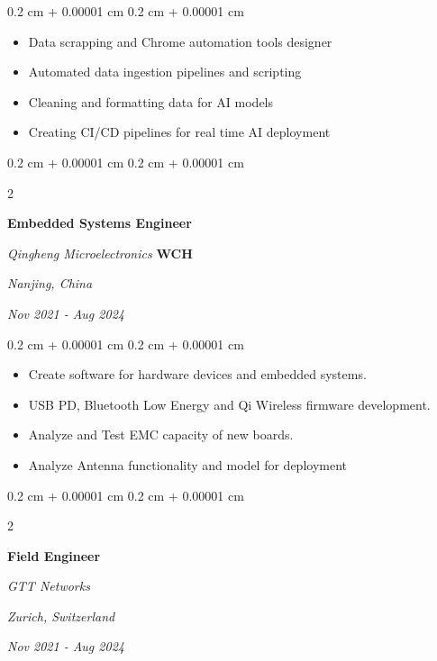 \documentclass[10pt, letterpaper]{article}
\newenvironment{highlights}{
    \begin{itemize}[
        topsep=0.10 cm,
        parsep=0.10 cm,
        partopsep=0pt,
        itemsep=0pt,
        leftmargin=0.4 cm + 10pt
    ]
}{
    \end{itemize}
} %
\newenvironment{onecolentry}{
    \begin{adjustwidth}{
        0.2 cm + 0.00001 cm
    }{
        0.2 cm + 0.00001 cm
    }
}{
    \end{adjustwidth}
} %
\newenvironment{twocolentry}[2][]{
    \onecolentry
    \def\secondColumn{#2}
    \setcolumnwidth{\fill, 4.5 cm}
    \begin{paracol}{2}
}{
    \switchcolumn \raggedleft \secondColumn
    \end{paracol}
    \endonecolentry
} %
\begin{document}
        \vspace{0.10 cm}
        \begin{onecolentry}
            \begin{highlights}
                \item Data scrapping and Chrome automation tools designer
                \item Automated data ingestion pipelines and scripting
                \item Cleaning and formatting data for AI models
                \item Creating CI/CD pipelines for real time AI deployment
            \end{highlights}
        \end{onecolentry}


        \vspace{0.5 cm}

        \begin{twocolentry}{
        \textit{Nanjing, China}    
            
        \textit{Nov 2021 - Aug 2024}}
            \textbf{Embedded Systems Engineer}
            
            \textit{Qingheng Microelectronics } \textbf{WCH}
        \end{twocolentry}

        \vspace{0.10 cm}
        \begin{onecolentry}
            \begin{highlights}
                \item Create software for hardware devices and embedded systems.
                \item USB PD, Bluetooth Low Energy and Qi Wireless firmware development.
                \item Analyze and Test EMC capacity of new boards.
                \item Analyze Antenna functionality and model for deployment
            \end{highlights}
        \end{onecolentry}

        
        \vspace{0.5 cm}

        \begin{twocolentry}{
        \textit{Zurich, Switzerland}    
            
        \textit{Nov 2021 - Aug 2024}}
            \textbf{Field Engineer}
            
            \textit{GTT Networks}
        \end{twocolentry}
\end{document}
